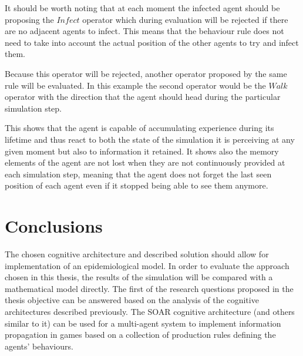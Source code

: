 It should be worth noting that at each moment the infected agent should be proposing the $Infect$ operator which during evaluation will be rejected if there are no adjacent agents to infect.
This means that the behaviour rule does not need to take into account the actual position of the other agents to try and infect them.

Because this operator will be rejected, another operator proposed by the same rule will be evaluated.
In this example the second operator would be the $Walk$ operator with the direction that the agent should head during the particular simulation step.

This shows that the agent is capable of accumulating experience during its lifetime and thus react to both the state of the simulation it is perceiving at any given moment but also to information it retained.
It shows also the memory elements of the agent are not lost when they are not continuously provided at each simulation step, meaning that the agent does not forget the last seen position of each agent even if it stopped being able to see them anymore.

\section{Conclusions}

The chosen cognitive architecture and described solution should allow for implementation of an epidemiological model.
In order to evaluate the approach chosen in this thesis, the results of the simulation will be compared with a mathematical model directly.
The first of the research questions proposed in the thesis objective can be answered based on the analysis of the cognitive architectures described previously.
The SOAR cognitive architecture (and others similar to it) can be used for a multi-agent system to implement information propagation in games based on a collection of production rules defining the agents' behaviours.
